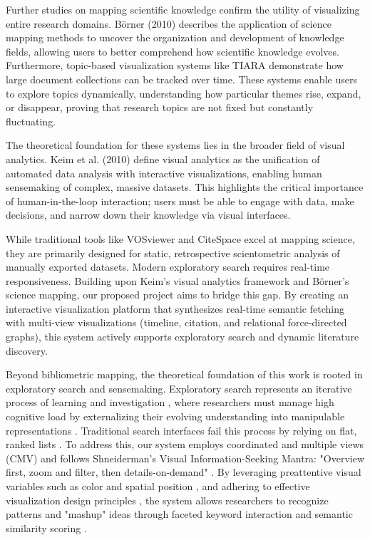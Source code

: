 \documentclass[sigconf]{acmart}
\begin{document}
Further studies on mapping scientific knowledge confirm the utility of visualizing entire research domains. Börner (2010) \cite{borner2010atlas} describes the application of science mapping methods to uncover the organization and development of knowledge fields, allowing users to better comprehend how scientific knowledge evolves. Furthermore, topic-based visualization systems like TIARA \cite{liu2012tiara} demonstrate how large document collections can be tracked over time. These systems enable users to explore topics dynamically, understanding how particular themes rise, expand, or disappear, proving that research topics are not fixed but constantly fluctuating. 

The theoretical foundation for these systems lies in the broader field of visual analytics. Keim et al. (2010) \cite{keim2010visualanalytics} define visual analytics as the unification of automated data analysis with interactive visualizations, enabling human sensemaking of complex, massive datasets. This highlights the critical importance of human-in-the-loop interaction; users must be able to engage with data, make decisions, and narrow down their knowledge via visual interfaces.

While traditional tools like VOSviewer and CiteSpace excel at mapping science, they are primarily designed for static, retrospective scientometric analysis of manually exported datasets. Modern exploratory search requires real-time responsiveness. Building upon Keim’s visual analytics framework and Börner’s science mapping, our proposed project aims to bridge this gap. By creating an interactive visualization platform that synthesizes real-time semantic fetching with multi-view visualizations (timeline, citation, and relational force-directed graphs), this system actively supports exploratory search and dynamic literature discovery.

Beyond bibliometric mapping, the theoretical foundation of this work is rooted in exploratory search and sensemaking. Exploratory search represents an iterative process of learning and investigation \cite{marchionini2006exploratory, white2009exploratory}, where researchers must manage high cognitive load by externalizing their evolving understanding into manipulable representations \cite{pirolli2005sensemaking, kirsh2010thinking}. Traditional search interfaces fail this process by relying on flat, ranked lists \cite{hearst2009search}. To address this, our system employs coordinated and multiple views (CMV) \cite{roberts2007state} and follows Shneiderman’s Visual Information-Seeking Mantra: "Overview first, zoom and filter, then details-on-demand" \cite{shneiderman1996eyes}. By leveraging preattentive visual variables such as color and spatial position \cite{ware2019information}, and adhering to effective visualization design principles \cite{munzner2014visualization}, the system allows researchers to recognize patterns and "mashup" ideas through faceted keyword interaction \cite{kules2009exploratory} and semantic similarity scoring \cite{ammar2018construction, wang2020microsoft}.
\end{document}
